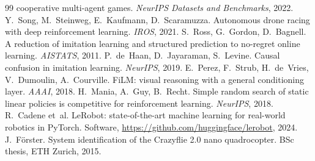 \documentclass[11pt,a4paper]{article}
\begin{document}
\begin{thebibliography}{99}
cooperative multi-agent games. \emph{NeurIPS Datasets and Benchmarks}, 2022.
 Y.~Song, M.~Steinweg, E.~Kaufmann, D.~Scaramuzza. Autonomous drone racing with deep
reinforcement learning. \emph{IROS}, 2021.
 S.~Ross, G.~Gordon, D.~Bagnell. A reduction of imitation learning and structured prediction to
no-regret online learning. \emph{AISTATS}, 2011.
 P.~de~Haan, D.~Jayaraman, S.~Levine. Causal confusion in imitation learning. \emph{NeurIPS}, 2019.
 E.~Perez, F.~Strub, H.~de~Vries, V.~Dumoulin, A.~Courville. FiLM: visual reasoning with a general
conditioning layer. \emph{AAAI}, 2018.
 H.~Mania, A.~Guy, B.~Recht. Simple random search of static linear policies is competitive for
reinforcement learning. \emph{NeurIPS}, 2018.
 R.~Cadene et~al. LeRobot: state-of-the-art machine learning for real-world robotics in PyTorch.
Software, \url{https://github.com/huggingface/lerobot}, 2024.
 J.~F\"orster. System identification of the Crazyflie 2.0 nano quadrocopter. BSc thesis, ETH Zurich, 2015.
\end{thebibliography}
\end{document}
